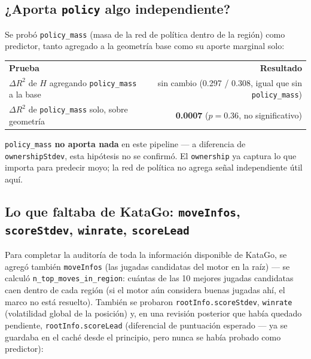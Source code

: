 \documentclass[11pt, a4paper]{article}
\newcommand{\TH}[1]{\cellcolor{cTHbg}\color{white}\textbf{#1}}
\newcommand{\bad}[1]{\color{cBad}\textbf{#1}}
\begin{document}
\subsection{¿Aporta \texttt{policy} algo independiente?}

Se prob\'o \texttt{policy\_mass} (masa de la red de pol\'itica dentro
de la regi\'on) como predictor, tanto agregado a la geometr\'ia base
como su aporte marginal solo:

\medskip
\begin{center}
\begin{tabular}{lr}
  \TH{Prueba} & \TH{Resultado} \\[1pt]
  $\Delta R^2$ de $H$ agregando \texttt{policy\_mass} a la base & sin cambio (0.297 / 0.308, igual que sin \texttt{policy\_mass}) \\
  $\Delta R^2$ de \texttt{policy\_mass} solo, sobre geometr\'ia & \bad{0.0007} ($p=0.36$, no significativo) \\
\end{tabular}
\end{center}
\medskip

\texttt{policy\_mass} \textbf{no aporta nada} en este pipeline ---
a diferencia de \texttt{ownershipStdev}, esta hip\'otesis no se
confirm\'o. El \texttt{ownership} ya captura lo que importa para
predecir moyo; la red de pol\'itica no agrega se\~nal independiente
\'util aqu\'i.

\subsection{Lo que faltaba de KataGo: \texttt{moveInfos}, \texttt{scoreStdev}, \texttt{winrate}, \texttt{scoreLead}}

Para completar la auditor\'ia de toda la informaci\'on disponible de
KataGo, se agreg\'o tambi\'en \texttt{moveInfos} (las jugadas candidatas
del motor en la ra\'iz) --- se calcul\'o \texttt{n\_top\_moves\_in\_region}:
cu\'antas de las 10 mejores jugadas candidatas caen dentro de cada
regi\'on (si el motor a\'un considera buenas jugadas ah\'i, el marco
no est\'a resuelto). Tambi\'en se probaron \texttt{rootInfo.scoreStdev},
\texttt{winrate} (volatilidad global de la posici\'on) y, en una
revisi\'on posterior que hab\'ia quedado pendiente,
\texttt{rootInfo.scoreLead} (diferencial de puntuaci\'on esperado ---
ya se guardaba en el cach\'e desde el principio, pero nunca se hab\'ia
probado como predictor):
\end{document}
